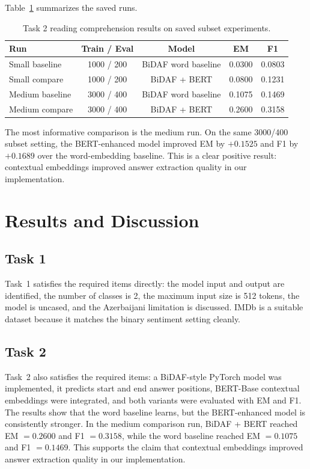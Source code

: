 \documentclass[10pt]{article}
\begin{document}
Table~\ref{tab:qa-results} summarizes the saved runs.

\begin{table}[h]
\centering
\small
\begin{tabular}{lcccc}
\toprule
Run & Train / Eval & Model & EM & F1 \\
\midrule
Small baseline & 1000 / 200 & BiDAF word baseline & 0.0300 & 0.0803 \\
Small compare & 1000 / 200 & BiDAF + BERT & 0.0800 & 0.1231 \\
Medium baseline & 3000 / 400 & BiDAF word baseline & 0.1075 & 0.1469 \\
Medium compare & 3000 / 400 & BiDAF + BERT & 0.2600 & 0.3158 \\
\bottomrule
\end{tabular}
\caption{Task 2 reading comprehension results on saved subset experiments.}
\label{tab:qa-results}
\end{table}

The most informative comparison is the medium run. On the same 3000/400 subset setting, the BERT-enhanced model improved EM by $+0.1525$ and F1 by $+0.1689$ over the word-embedding baseline. This is a clear positive result: contextual embeddings improved answer extraction quality in our implementation.

\section{Results and Discussion}
\subsection{Task 1}
Task~1 satisfies the required items directly: the model input and output are identified, the number of classes is 2, the maximum input size is 512 tokens, the model is uncased, and the Azerbaijani limitation is discussed. IMDb is a suitable dataset because it matches the binary sentiment setting cleanly.

\subsection{Task 2}
Task~2 also satisfies the required items: a BiDAF-style PyTorch model was implemented, it predicts start and end answer positions, BERT-Base contextual embeddings were integrated, and both variants were evaluated with EM and F1. The results show that the word baseline learns, but the BERT-enhanced model is consistently stronger. In the medium comparison run, BiDAF + BERT reached EM $=0.2600$ and F1 $=0.3158$, while the word baseline reached EM $=0.1075$ and F1 $=0.1469$. This supports the claim that contextual embeddings improved answer extraction quality in our implementation.
\end{document}
